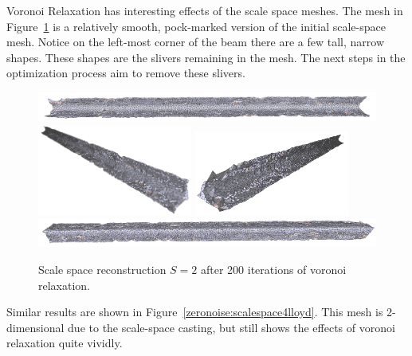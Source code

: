 \documentclass[12pt]{drexelthesis}
\begin{document}
Voronoi Relaxation has interesting effects of the scale space meshes. The mesh in Figure~\ref{zeronoise:scalespace2lloyd} is a relatively smooth, pock-marked version of the initial scale-space mesh. Notice on the left-most corner of the beam there are a few tall, narrow shapes. These shapes are the slivers remaining in the mesh. The next steps in the optimization process aim to remove these slivers.

\begin{figure}[!ht]
	
	\centering
		\includegraphics[width=5in]{simulated-lab-scan/0noise/optimizedNeat/scalespace2lloyd00.png}
		\includegraphics[width=2in]{simulated-lab-scan/0noise/optimizedNeat/scalespace2lloyd01.png}
		\includegraphics[width=2in]{simulated-lab-scan/0noise/optimizedNeat/scalespace2lloyd02.png}
		\includegraphics[width=5in]{simulated-lab-scan/0noise/optimizedNeat/scalespace2lloyd03.png}
		\caption[Scale space reconstruction $S = 2$ after 200 iterations of voronoi relaxation]{\centering Scale space reconstruction $S = 2$ after 200 iterations of voronoi relaxation.}
	\label{zeronoise:scalespace2lloyd}
\end{figure}

Similar results are shown in Figure~\ref{zeronoise:scalespace4lloyd}. This mesh is 2-dimensional due to the scale-space casting, but still shows the effects of voronoi relaxation quite vividly.
\end{document}
